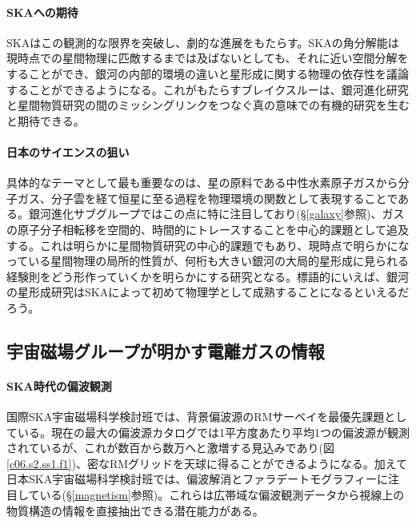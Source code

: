 \paragraph{SKAへの期待}

SKAはこの観測的な限界を突破し、劇的な進展をもたらす。SKAの角分解能は現時点での星間物理に匹敵するまでは及ばないとしても、それに近い空間分解をすることができ、銀河の内部的環境の違いと星形成に関する物理の依存性を議論することができるようになる。これがもたらすブレイクスルーは、銀河進化研究と星間物質研究の間のミッシングリンクをつなぐ真の意味での有機的研究を生むと期待できる。

\paragraph{日本のサイエンスの狙い}

具体的なテーマとして最も重要なのは、星の原料である中性水素原子ガスから分子ガス、分子雲を経て恒星に至る過程を物理環境の関数として表現することである。銀河進化サブグループではこの点に特に注目しており(\S \ref{galaxy}参照)、ガスの原子分子相転移を空間的、時間的にトレースすることを中心的課題として追及する。これは明らかに星間物質研究の中心的課題でもあり、現時点で明らかになっている星間物理の局所的性質が、何桁も大きい銀河の大局的星形成に見られる経験則をどう形作っていくかを明らかにする研究となる。標語的にいえば、銀河の星形成研究はSKAによって初めて物理学として成熟することになるといえるだろう。


\subsection{宇宙磁場グループが明かす電離ガスの情報}
\label{c08.s4.ss6}

\paragraph{SKA時代の偏波観測}

国際SKA宇宙磁場科学検討班では、背景偏波源のRMサーベイを最優先課題としている。現在の最大の偏波源カタログでは1平方度あたり平均1つの偏波源が観測されているが、これが数百から数万へと激増する見込みであり(図\ref{c06.s2.ss1.f1})、密なRMグリッドを天球に得ることができるようになる。加えて日本SKA宇宙磁場科学検討班では、偏波解消とファラデートモグラフィーに注目している(\S \ref{magnetism}参照)。これらは広帯域な偏波観測データから視線上の物質構造の情報を直接抽出できる潜在能力がある。

